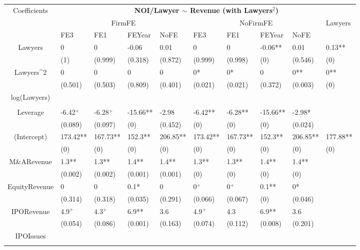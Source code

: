 \documentclass{article}
\begin{document}
\begin{table}[H]
\centering
\begin{tabular}{|clllllllll|}
\hline
\multirow{3}{*}{Coefficients} & \multicolumn{9}{c|}{\textbf{NOI/Lawyer $\sim$ Revenue (with Lawyers$^2$)}} \\
\cline{2-10}
& \multicolumn{4}{c}{FirmFE} & \multicolumn{4}{c}{NoFirmFE} & \multirow{2}{*}{Lawyers} \\
\cline{2-9}
& FE3 & FE1 & FEYear & NoFE & FE3 & FE1 & FEYear & NoFE &  \\
\hline
 
Lawyers & 0 & 0 & -0.06 & 0.01 & 0 & 0 & -0.06** & 0.01 & 0.13** \\ 
   & (1) & (0.999) & (0.318) & (0.872) & (0.999) & (0.998) & (0) & (0.546) & (0) \\ 
  Lawyers^2 & 0 & 0 & 0 & 0 & 0* & 0* & 0 & 0** & 0** \\ 
   & (0.501) & (0.503) & (0.809) & (0.401) & (0.021) & (0.021) & (0.372) & (0.003) & (0) \\ 
  log(Lawyers) &  &  &  &  &  &  &  &  &  \\ 
   &  &  &  &  &  &  &  &  &  \\ 
  Leverage & -6.42$^{+}$ & -6.28$^{+}$ & -15.66** & -2.98 & -6.42** & -6.28** & -15.66** & -2.98* &  \\ 
   & (0.089) & (0.097) & (0) & (0.452) & (0) & (0) & (0) & (0.024) &  \\ 
  (Intercept) & 173.42** & 167.73** & 152.3** & 206.85** & 173.42** & 167.73** & 152.3** & 206.85** & 177.88** \\ 
   & (0) & (0) & (0) & (0) & (0) & (0) & (0) & (0) & (0) \\ 
  M\&ARevenue & 1.3** & 1.3** & 1.4** & 1.4** & 1.3** & 1.3** & 1.4** & 1.4** &  \\ 
   & (0.002) & (0.002) & (0.001) & (0.001) & (0) & (0) & (0) & (0) &  \\ 
  EquityRevenue & 0 & 0 & 0.1* & 0 & 0$^{+}$ & 0$^{+}$ & 0.1** & 0* &  \\ 
   & (0.314) & (0.318) & (0.035) & (0.291) & (0.066) & (0.067) & (0) & (0.046) &  \\ 
  IPORevenue & 4.9$^{+}$ & 4.3$^{+}$ & 6.9** & 3.6 & 4.9$^{+}$ & 4.3 & 6.9** & 3.6 &  \\ 
   & (0.054) & (0.086) & (0.001) & (0.163) & (0.074) & (0.112) & (0.008) & (0.201) &  \\ 
  IPOIssues &  &  &  &  &  &  &  &  &  \\ 
   &  &  &  &  &  &  &  &  &  \\ 

\end{tabular}
\end{table}
\end{document}
